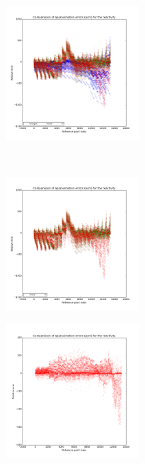 \begin{center}
\begin{figure}[!h]\ContinuedFloat
		\centering
		\begin{subfigure}[b]{0.45\textwidth}
		\includegraphics[width=\linewidth,height=5cm]{images/UOX-Gd/ReactivityError_with_cocagne.png}
\end{subfigure}
~
\begin{subfigure}[b]{0.45\textwidth}
		\includegraphics[width=\linewidth,height=5cm]{images/UOX-Gd/ReactivityError.png}
		\end{subfigure}
		\begin{subfigure}[b]{0.45\textwidth}
		\includegraphics[width=\linewidth,height=5cm]{images/UOX-Gd/ReactivityError_alone.png}
		\end{subfigure}
\end{figure}

\label{figure:resultsannexe}
\end{center}




